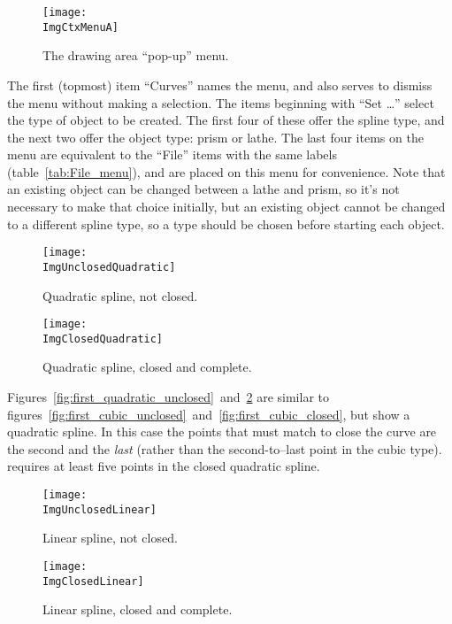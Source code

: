 		\begin{figure}[htbp]
		\centering
		\texttt{[image: \\ImgCtxMenuA]}
		\caption{The drawing area ``pop-up'' menu.}
		\label{fig:canvas_popup_menu}
		\end{figure}

		The first (topmost)  item ``Curves''
		names the menu, and also serves to dismiss the menu
		without making a selection.
		The  items beginning with ``Set \ldots''
		select the type of object to be created. The first four
		of these offer the spline type, and the next two offer the
		\IXpov{} object type: prism or lathe. The last four
		items on the menu
		are equivalent to the ``File''  items
		with the same labels
		(table~\ref{tab:File_menu}), and are placed on this menu
		for convenience. Note that an existing object can
		be changed between a lathe and prism, so it's not
		necessary to make that choice initially, but an existing
		object cannot be changed to a different spline type, so
		a type should be chosen before starting each object.

		\begin{figure}[htbp]
		\centering
		\texttt{[image: \\ImgUnclosedQuadratic]}
		\caption{Quadratic spline, not closed.}
		\label{fig:first_quadratic_unclosed}
		\vspace{16pt}
		\texttt{[image: \\ImgClosedQuadratic]}
		\caption{Quadratic spline, closed and complete.}
		\label{fig:first_quadratic_closed}
		\end{figure}

		Figures~\ref{fig:first_quadratic_unclosed}~and~\ref{fig:first_quadratic_closed}
		are similar to
		figures~\ref{fig:first_cubic_unclosed}~and~\ref{fig:first_cubic_closed},
		but show a quadratic spline. In this case the points that
		must match to close the curve are the second and the
		\emph{last} (rather than the second-to--last
		point in the cubic type).
		\IXpov{} requires at least five points in the closed
		quadratic spline.

		\begin{figure}[htbp]
		\centering
		\texttt{[image: \\ImgUnclosedLinear]}
		\caption{Linear spline, not closed.}
		\label{fig:first_linear_unclosed}
		\vspace{16pt}
		\texttt{[image: \\ImgClosedLinear]}
		\caption{Linear spline, closed and complete.}
		\label{fig:first_linear_closed}
		\end{figure}

